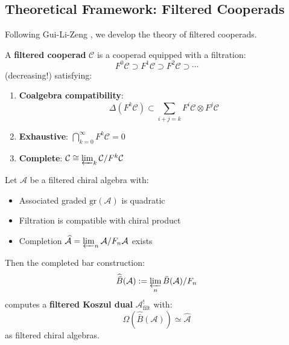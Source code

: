 \subsection{Theoretical Framework: Filtered Cooperads}

Following Gui-Li-Zeng \cite{GLZ22}, we develop the theory of filtered cooperads.

\begin{definition}\label{def:filtered-cooperad}
A \textbf{filtered cooperad} $\mathcal{C}$ is a cooperad equipped with a filtration:
\begin{equation}
F^0\mathcal{C} \supset F^1\mathcal{C} \supset F^2\mathcal{C} \supset \cdots
\end{equation}
(decreasing!) satisfying:
\begin{enumerate}
\item \textbf{Coalgebra compatibility}: 
$$\Delta(F^k\mathcal{C}) \subset \sum_{i+j=k} F^i\mathcal{C} \otimes F^j\mathcal{C}$$
\item \textbf{Exhaustive}: $\bigcap_{k=0}^\infty F^k\mathcal{C} = 0$
\item \textbf{Complete}: $\mathcal{C} \cong \varprojlim_k \mathcal{C}/F^k\mathcal{C}$
\end{enumerate}
\end{definition}

\begin{theorem}\label{thm:filtered-koszul-glz}
Let $\mathcal{A}$ be a filtered chiral algebra with:
\begin{itemize}
\item Associated graded $\text{gr}(\mathcal{A})$ is quadratic
\item Filtration is compatible with chiral product
\item Completion $\widehat{\mathcal{A}} = \varprojlim_n \mathcal{A}/F_n\mathcal{A}$ exists
\end{itemize}

Then the completed bar construction:
\begin{equation}
\widehat{\bar{B}}(\mathcal{A}) := \varprojlim_n \bar{B}(\mathcal{A})/F_n
\end{equation}
computes a \textbf{filtered Koszul dual} $\mathcal{A}^!_{\text{filt}}$ with:
\begin{equation}
\Omega(\widehat{\bar{B}}(\mathcal{A})) \simeq \widehat{\mathcal{A}}
\end{equation}
as filtered chiral algebras.
\end{theorem}

